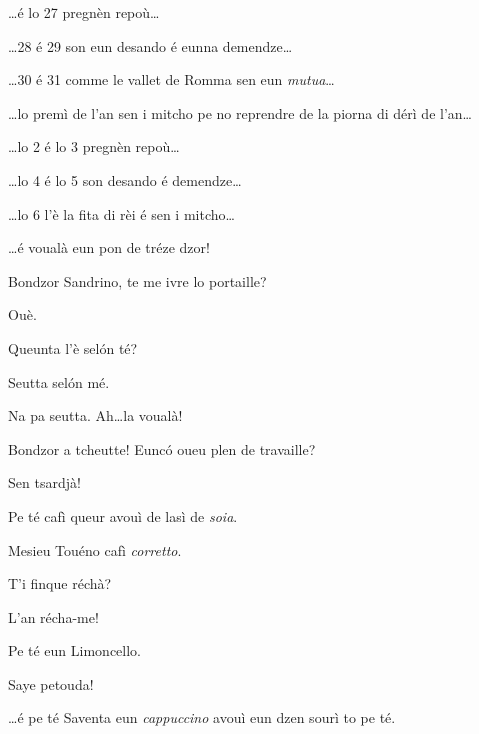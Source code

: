 \begin{drama}
\Richardspeaks \ldots é lo 27 pregnèn repoù\ldots

\Gerominespeaks \ldots 28 é 29 son eun desando é eunna demendze\ldots

\Saventaspeaks \ldots 30 é 31 comme le vallet de Romma sen eun \textit{mutua}\ldots

\Spritzspeaks \ldots lo premì de l’an sen i mitcho pe no reprendre de la piorna di dérì de l'an\ldots

\Tuenospeaks \ldots lo 2 é lo 3 pregnèn repoù\ldots

\Richardspeaks \ldots lo 4 é lo 5 son desando é demendze\ldots

\Gerominespeaks \ldots lo 6 l'è la fita di rèi é sen i mitcho\ldots

\Tcheutte \ldots é voualà eun pon de tréze dzor!


\Baristaspeaks Bondzor Sandrino, te me ivre lo portaille?

\Sandrinospeaks Ouè.


\Sandrinospeaks{} Queunta l'è sel\'on té?

\Baristaspeaks{} Seutta sel\'on mé.

\Sandrinospeaks Na pa seutta. Ah\ldots la voualà!


\Baristaspeaks Bondzor a tcheutte! Eunc\'o oueu plen de travaille?

\Gerominespeaks Sen tsardjà!


\Baristaspeaks{} Pe té cafì queur avouì de lasì de \textit{soia}.

\Baristaspeaks{} Mesieu Touéno cafì \textit{corretto}.

\Baristaspeaks{} T'i finque réchà? 

\Spritzspeaks L'an récha-me!

\Baristaspeaks Pe té eun Limoncello.

\Spritzspeaks Saye petouda!

\Baristaspeaks{} \ldots é pe té Saventa eun \textit{cappuccino} avouì eun dzen sourì to pe té.


\end{drama}
